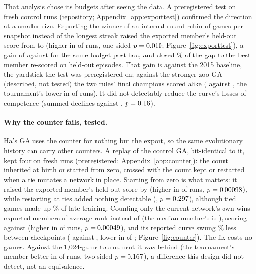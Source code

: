 \documentclass[11pt]{article}
\begin{document}
That analysis chose its budgets after seeing the data. A preregistered test
on \nXRuns{} fresh control runs (repository; Appendix~\ref{app:exporttest})
confirmed the direction at a smaller size. Exporting the winner of an internal
round robin of \nReexportGamesSixteen{} games per snapshot instead of the
longest streak raised the exported member's held-out score from
\nXStreakLevel{} to \nXTourneyLevel{} (higher in \nXImproved{} of \nXRuns{}
runs, one-sided $p=0.010$; Figure~\ref{fig:exporttest}), a gain of \nXGain{}
against \nReexportGainSixteen{} for the same budget post hoc, and closed
\nXRecoveredPct\% of the gap to the best member re-scored on held-out
episodes. That gain is against the 2015 baseline, the yardstick the test was
preregistered on; against the stronger zoo GA (described, not tested) the two
rules' final champions scored alike (\nXZooTourney{} against \nXZooStreak,
the tournament's lower in \nXZooTourneyLower{} of \nXRuns{} runs). It did not
detectably reduce the curve's losses of competence (summed declines
\nXDeclTourney{} against \nXDeclStreak, $p=0.16$).

\paragraph{Why the counter fails, tested.} Ha's GA uses the counter for nothing
but the export, so the same evolutionary history can carry other counters. A
replay of the control GA, bit-identical to it, kept four on \nCtrRuns{} fresh
runs (preregistered; Appendix~\ref{app:counter}): the count inherited at birth
or started from zero, crossed with the count kept or restarted when a tie
mutates a network in place. Starting from zero is what matters: it raised the
exported member's held-out score by \nCtrNoinhMean{} (higher in
\nCtrNoinhRuns{} of \nCtrRuns{} runs, $p=0.00098$), while restarting at
ties added nothing detectable (\nCtrTieMean, $p=0.297$), although tied
games made up \nCtrTiesLatePct\% of late training. Counting only the current
network's own wins exported members of average rank \nCtrRankCur{} instead of
\nCtrRankInh{} (the median member's is \nCtrRankMed), scoring
\nCtrLevelCur{} against \nCtrLevelInh{} (higher in \nCtrFixRuns{} of
\nCtrRuns{} runs, $p=0.00049$), and its reported curve swung
\nCtrVolDropPct\% less between checkpoints (\nCtrVolInh{} against
\nCtrVolCur, lower in \nCtrVolhRuns{} of \nCtrRuns; Figure~\ref{fig:counter}).
The fix costs no games. Against the 1,024-game tournament it was
\nCtrVsTour{} behind (the tournament's member better in \nCtrTourHigher{} of
\nCtrRuns{} runs, two-sided $p=0.167$), a difference this design did not
detect, not an equivalence.
\end{document}
